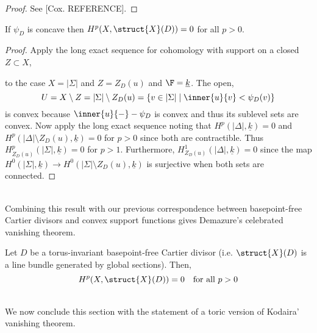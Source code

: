 \begin{proof}
See [Cox. REFERENCE].
\end{proof}

\begin{corollary}
If $\psi_D$ is concave then $H^p(X, \struct{X}(D)) = 0$ for all $p > 0$. 
\end{corollary}

\begin{proof}
Apply the long exact sequence for cohomology with support on a closed $Z \subset X$,
\begin{center}
\end{center}
to the case $X = | \Sigma |$ and $Z = Z_D(u)$ and $\F = \underline{k}$. The open, 
\[ U = X \setminus Z = |\Sigma| \setminus Z_D(u) = \{ v \in |\Sigma| \mid \inner{u}{v} < \psi_D(v) \} \]
is convex because $\inner{u}{-} - \psi_D$ is convex and thus its sublevel sets are convex. Now apply the long exact sequence noting that $H^p(|\Delta|, \underline{k}) = 0$ and $H^p(|\Delta| \setminus Z_D(u), \underline{k}) = 0$ for $p > 0$ since both are contractible. Thus $H^p_{Z_D(u)}(|\Sigma|, \underline{k}) = 0$ for $p > 1$. Furthermore, $H^1_{Z_D(u)}(|\Delta|, \underline{k}) = 0$ since the map $H^0(|\Sigma|, \underline{k}) \to H^0(|\Sigma| \setminus Z_D(u), \underline{k})$ is surjective when both sets are connected. 
\end{proof}
\noindent\\
Combining this result with our previous correspondence between basepoint-free Cartier divisors and convex support functions gives Demazure's celebrated vanishing theorem.

\begin{theorem}
Let $D$ be a torus-invariant basepoint-free Cartier divisor (i.e. $\struct{X}(D)$ is a line bundle generated by global sections). Then,
\[ H^p(X, \struct{X}(D)) = 0 \quad \text{for all } p > 0 \]
\end{theorem}
\noindent\\
We now conclude this section with the statement of a toric version of Kodaira' vanishing theorem.

